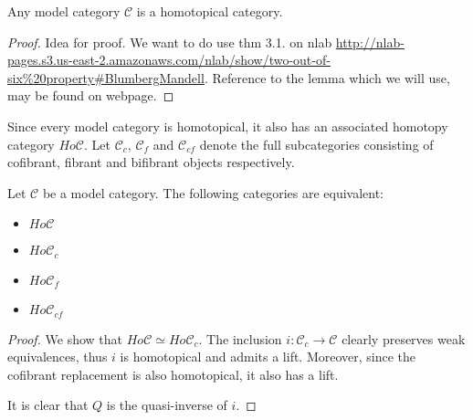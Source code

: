 \documentclass[../thesis.tex]{subfiles}
\begin{document}
            \begin{proposition}
                Any model category $\mathcal{C}$ is a homotopical category.
            \end{proposition}

            \begin{proof}
                Idea for proof. We want to do use thm 3.1. on nlab \url{http://nlab-pages.s3.us-east-2.amazonaws.com/nlab/show/two-out-of-six%20property#BlumbergMandell}. Reference to the lemma which we will use, may be found on webpage.
            \end{proof}

            Since every model category is homotopical, it also has an associated homotopy category $Ho\mathcal{C}$. Let $\mathcal{C}_c$, $\mathcal{C}_f$ and $\mathcal{C}_{cf}$ denote the full subcategories consisting of cofibrant, fibrant and bifibrant objects respectively.

            \begin{proposition}
                Let $\mathcal{C}$ be a model category. The following categories are equivalent:
                \begin{itemize}
                    \item $Ho\mathcal{C}$
                    \item $Ho\mathcal{C}_c$
                    \item $Ho\mathcal{C}_f$
                    \item $Ho\mathcal{C}_{cf}$
                \end{itemize}
            \end{proposition}

            \begin{proof}
                We show that $Ho\mathcal{C} \simeq Ho\mathcal{C}_c$. The inclusion $i:\mathcal{C}_c\rightarrow \mathcal{C}$ clearly preserves weak equivalences, thus $i$ is homotopical and admits a lift. Moreover, since the cofibrant replacement is also homotopical, it also has a lift.

                \begin{center}
                \end{center}

                It is clear that $Q$ is the quasi-inverse of $i$.

            \end{proof}
\end{document}
